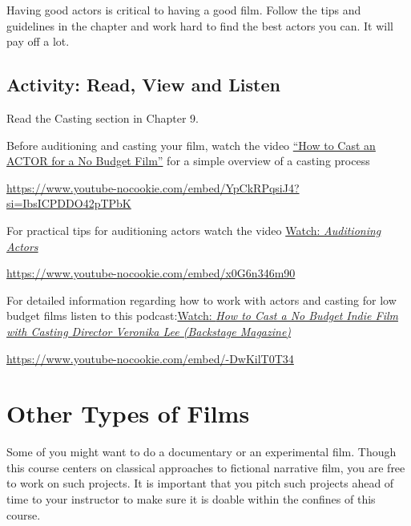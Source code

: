 \documentclass[
  letterpaper,
  DIV=11,
  numbers=noendperiod]{scrreprt}
\begin{document}
Having good actors is critical to having a good film. Follow the tips
and guidelines in the chapter and work hard to find the best actors you
can. It will pay off a lot.

\subsection*{Activity: Read, View and
Listen}\label{activity-read-view-and-listen}

\begin{tcolorbox}[enhanced jigsaw, titlerule=0mm, leftrule=.75mm, bottomrule=.15mm, colback=white, left=2mm, opacitybacktitle=0.6, title={Learning Activity}, colbacktitle=quarto-callout-note-color!10!white, colframe=quarto-callout-note-color-frame, bottomtitle=1mm, toptitle=1mm, opacityback=0, rightrule=.15mm, breakable, arc=.35mm, toprule=.15mm, coltitle=black]

Read the Casting section in Chapter 9.

Before auditioning and casting your film, watch the video
\href{https://www.youtube.com/watch?v=YpCkRPqsiJ4}{``How to Cast an
ACTOR for a No Budget Film''} for a simple overview of a casting process

\url{https://www.youtube-nocookie.com/embed/YpCkRPqsiJ4?si=IbsICPDDO42pTPbK}

For practical tips for auditioning actors watch the video
\href{https://www.youtube.com/watch?v=x0G6n346m90}{Watch:
\emph{Auditioning Actors}}

\url{https://www.youtube-nocookie.com/embed/x0G6n346m90}

For detailed information regarding how to work with actors and casting
for low budget films listen to this
podcast:\href{https://www.youtube.com/watch?v=-DwKilT0T34}{Watch:
\emph{How to Cast a No Budget Indie Film with Casting Director Veronika
Lee (Backstage Magazine)}}

\url{https://www.youtube-nocookie.com/embed/-DwKilT0T34}

\end{tcolorbox}

\section{Other Types of Films}\label{other-types-of-films}

Some of you might want to do a documentary or an experimental film.
Though this course centers on classical approaches to fictional
narrative film, you are free to work on such projects. It is important
that you pitch such projects ahead of time to your instructor to make
sure it is doable within the confines of this course.
\end{document}
